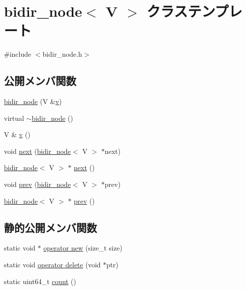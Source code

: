 \hypertarget{classbidir__node}{}\section{bidir\+\_\+node$<$ V $>$ クラステンプレート}
\label{classbidir__node}


{\ttfamily \#include $<$bidir\+\_\+node.\+h$>$}

\subsection*{公開メンバ関数}
\begin{DoxyCompactItemize}
\item 
\hyperlink{classbidir__node_a854687b3c2abf8087c390bc4d7ef90d9}{bidir\+\_\+node} (V \&\hyperlink{classbidir__node_a144596c53772e441240d51afeb8a475d}{v})
\item 
virtual \hyperlink{classbidir__node_a73267f07aa67bd4488fa684f1c5303b3}{$\sim$bidir\+\_\+node} ()
\item 
V \& \hyperlink{classbidir__node_a144596c53772e441240d51afeb8a475d}{v} ()
\item 
void \hyperlink{classbidir__node_a2e0451434557bab73a6950037073267a}{next} (\hyperlink{classbidir__node}{bidir\+\_\+node}$<$ V $>$ $\ast$next)
\item 
\hyperlink{classbidir__node}{bidir\+\_\+node}$<$ V $>$ $\ast$ \hyperlink{classbidir__node_af76a5d53aff4b6f71361fa7477d0c758}{next} ()
\item 
void \hyperlink{classbidir__node_a7864b76461d92f398efb90819854f67c}{prev} (\hyperlink{classbidir__node}{bidir\+\_\+node}$<$ V $>$ $\ast$prev)
\item 
\hyperlink{classbidir__node}{bidir\+\_\+node}$<$ V $>$ $\ast$ \hyperlink{classbidir__node_a4316757bf16173a1c04d84ddbc7fefc2}{prev} ()
\end{DoxyCompactItemize}
\subsection*{静的公開メンバ関数}
\begin{DoxyCompactItemize}
\item 
static void $\ast$ \hyperlink{classbidir__node_aec71c6df26420dff2ffdf5a43f8b613e}{operator new} (size\+\_\+t size)
\item 
static void \hyperlink{classbidir__node_a50277ce12bf4fccf682ad0a7d70b4e0b}{operator delete} (void $\ast$ptr)
\item 
static uint64\+\_\+t \hyperlink{classbidir__node_a9851f8255f82458826f5a4c615de9a2a}{count} ()
\end{DoxyCompactItemize}
